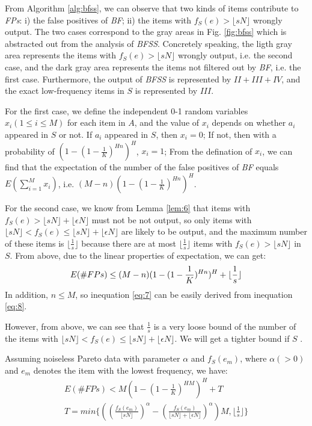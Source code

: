 \documentclass[conference]{IEEEtran}
\begin{document}
\begin{IEEEproof}
From Algorithm \ref{alg:bfss}, we can observe that two kinds of items contribute to \emph{FPs}: i) the false positives of \emph{BF}; ii) the items with $f_S(e)>\lfloor sN\rfloor$ wrongly output. The two cases correspond to the gray areas in Fig. \ref{fig:bfss} which is abstracted out from the analysis of \emph{BFSS}. Concretely speaking, the ligth gray area represents the items with $f_S(e)>\lfloor sN\rfloor$ wrongly output, i.e. the second case, and the dark gray area represents the items not filtered out by \emph{BF}, i.e. the first case. Furthermore, the output of \emph{BFSS} is represented by $II+III+IV$, and the exact low-frequency items in $S$ is represented by $III$.\par
For the first case, we define the independent 0-1 random variables $x_i(1\leq i\leq M)$ for each item in $A$, and the value of $x_i$ depends on whether $a_i$ appeared in $S$ or not. If $a_i$ appeared in $S$, then $x_i=0$; If not, then with a probability of $(1-(1-\frac{1}{K})^{Hn})^H$, $x_i=1$; From the defination of $x_i$, we can find that the expectation of the number of the false positives of \emph{BF} equals $E(\sum_{i=1}^{M}x_i)$, i.e. $(M-n)(1-(1-\frac{1}{K})^{Hn})^H$.\par 
For the second case, we know from Lemma \ref{lem:6} that items with $f_S(e)>\lfloor sN\rfloor+\lfloor \epsilon N\rfloor$ must not be not output, so only items with $\lfloor sN\rfloor<f_S(e)\leq \lfloor sN\rfloor+\lfloor \epsilon N\rfloor$ are likely to be output, and the maximum number of these items is $\lfloor\frac{1}{s}\rfloor$ because there are at most $\lfloor\frac{1}{s}\rfloor$ items with $f_S(e)>\lfloor sN\rfloor$ in $S$. From above, due to the linear properties of expectation, we can get:
\begin{equation}\label{eq:8}
E(\#FPs)\leq (M-n)(1-(1-\frac{1}{K})^{Hn})^H+\lfloor\frac{1}{s}\rfloor\\
\end{equation}
\indent In addition, $n\leq M$, so inequation \ref{eq:7} can be easily derived from inequation \ref{eq:8}.
\end{IEEEproof}
However, from above, we can see that $\frac{1}{s}$ is a very loose bound of the number of the items with $\lfloor sN\rfloor<f_S(e)\leq \lfloor sN\rfloor+\lfloor \epsilon N\rfloor$. We will get a tighter bound if $S$ .

\begin{theorem}\label{thm:3}
Assuming noiseless Pareto data with parameter $\alpha$ and $f_S(e_m)$, where $\alpha (>0)$ and $e_m$ denotes the item with the lowest frequency, we have:
\setlength{\arraycolsep}{0.0em}
\begin{eqnarray}
	E(\#FPs)<M(1-(1-\frac{1}{K})^{HM})^H + T\\
	T=min\{((\frac{f_S(e_m)}{\lfloor sN\rfloor})^\alpha-(\frac{f_S(e_m)}{\lfloor sN\rfloor+\lfloor \epsilon N\rfloor})^\alpha)M,\lfloor\frac{1}{s}\rfloor\}\label{eq:10}
\end{eqnarray}
\setlength{\arraycolsep}{5pt}
\end{theorem}
\end{document}

